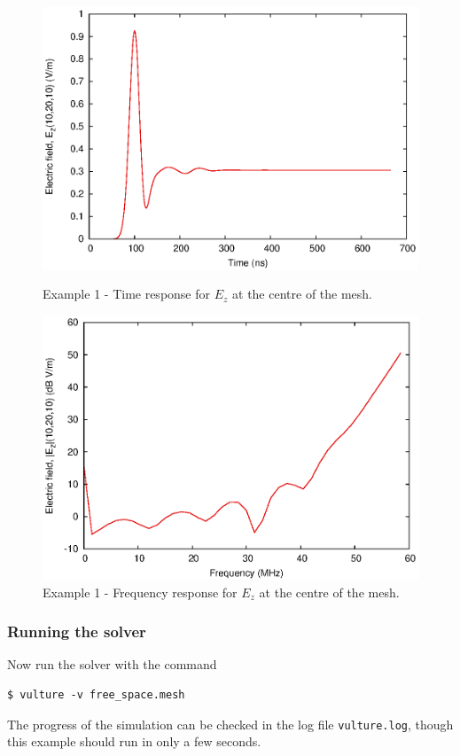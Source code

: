 \documentclass[onecolumn,a4paper]{article}
\numberwithin{equation}{section}
\begin{document}
\begin{figure}[ht!]
 \centerline{\includegraphics[width=12cm]{figures/free_space_td}}
 \caption{\label{fg:free_space_td} Example 1 - Time response for $E_z$ at the centre of the mesh.}
 \centerline{\includegraphics[width=12cm]{figures/free_space_fd}}
 \caption{\label{fg:free_space_fd} Example 1 - Frequency response for $E_z$ at the centre of the mesh.}
\end{figure}

\subsubsection{Running the solver}

Now run the solver with the command
\begin{verbatim}
$ vulture -v free_space.mesh
\end{verbatim}
The progress of the simulation can be checked in the log file \texttt{vulture.log}, though
this example should run in only a few seconds.
\end{document}
